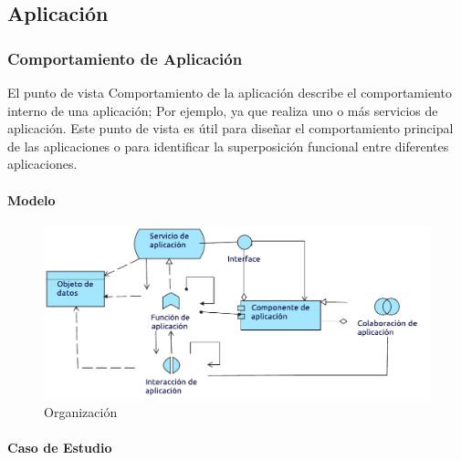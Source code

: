 \subsection{Aplicación}

\subsubsection{Comportamiento de Aplicación}
El punto de vista Comportamiento de la aplicación describe el comportamiento interno de una aplicación; Por ejemplo, ya que realiza uno o más servicios de aplicación. Este punto de vista es útil para diseñar el comportamiento principal de las aplicaciones o para identificar la superposición funcional entre diferentes aplicaciones.

\paragraph{Modelo}

\begin{figure}[htbp]
	\centering
	\includegraphics[width=\linewidth]{Desarrollo/ArquitecturaEmpresarial/Aplicacion/imgs/ComportamientoMetamodelo.pdf}
	\caption{Organización}
\end{figure}
\newpage
\paragraph{Caso de Estudio}

